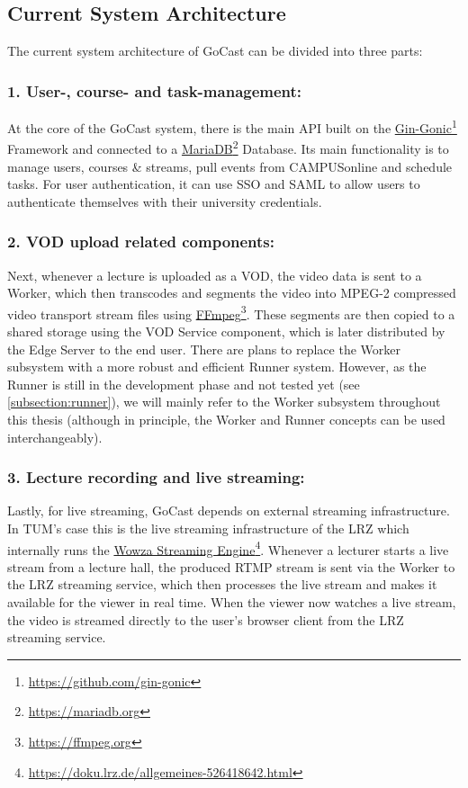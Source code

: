 \subsection{Current System Architecture}

The current system architecture of GoCast can be divided into three parts:

\subsubsection{1. User-, course- and task-management:}
At the core of the GoCast system, there is the main \ac{API} built on the \href{https://github.com/gin-gonic/gin}{Gin-Gonic}\footnote{\url{https://github.com/gin-gonic}} Framework and connected to a \href{https://mariadb.org}{MariaDB}\footnote{\url{https://mariadb.org}} Database. Its main functionality is to manage users, courses \& streams, pull events from CAMPUSonline and schedule tasks. For user authentication, it can use \ac{SSO} and \ac{SAML} to allow users to authenticate themselves with their university credentials.

\subsubsection{2. \ac{VOD} upload related components:}
Next, whenever a lecture is uploaded as a VOD, the video data is sent to a Worker, which then transcodes and segments the video into MPEG-2 compressed video transport stream files using \href{https://ffmpeg.org/}{FFmpeg}\footnote{\url{https://ffmpeg.org}}. These segments are then copied to a shared storage using the VOD Service component, which is later distributed by the Edge Server to the end user.
There are plans to replace the Worker subsystem with a more robust and efficient Runner system. However, as the Runner is still in the development phase and not tested yet (see \autoref{subsection:runner}), we will mainly refer to the Worker subsystem throughout this thesis (although in principle, the Worker and Runner concepts can be used interchangeably).

\subsubsection{3. Lecture recording and live streaming:}
Lastly, for live streaming, GoCast depends on external streaming infrastructure. In \ac{TUM}'s case this is the live streaming infrastructure of the \ac{LRZ} which internally runs the \href{https://doku.lrz.de/allgemeines-526418642.html}{Wowza Streaming Engine}\footnote{\url{https://doku.lrz.de/allgemeines-526418642.html}}. Whenever a lecturer starts a live stream from a lecture hall, the produced \ac{RTMP} stream is sent via the Worker to the \ac{LRZ} streaming service, which then processes the live stream and makes it available for the viewer in real time. When the viewer now watches a live stream, the video is streamed directly to the user's browser client from the \ac{LRZ} streaming service. 

